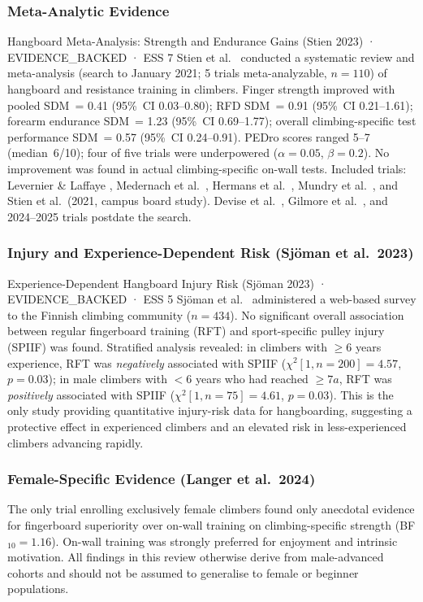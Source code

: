 \subsubsection{Meta-Analytic Evidence}

\begin{evidencebox}{Hangboard Meta-Analysis: Strength and Endurance Gains (Stien 2023) · EVIDENCE\_BACKED · ESS 7}
Stien et al.\ \cite{SO23} conducted a systematic review and meta-analysis (search to January 2021; 5 trials meta-analyzable, $n=110$) of hangboard and resistance training in climbers. Finger strength improved with pooled SDM~= 0.41 (95\%~CI 0.03--0.80); RFD SDM~= 0.91 (95\%~CI 0.21--1.61); forearm endurance SDM~= 1.23 (95\%~CI 0.69--1.77); overall climbing-specific test performance SDM~= 0.57 (95\%~CI 0.24--0.91). PEDro scores ranged 5--7 (median~6/10); four of five trials were underpowered ($\alpha = 0.05$, $\beta = 0.2$). No improvement was found in actual climbing-specific on-wall tests. Included trials: Levernier \& Laffaye \cite{LEV19}, Medernach et al.\ \cite{MO15}, Hermans et al.\ \cite{HO22}, Mundry et al.\ \cite{MSAE21}, and Stien et al.\ (2021, campus board study). Devise et al.\ \cite{DO22}, Gilmore et al.\ \cite{GKAO24}, and 2024--2025 trials postdate the search.
\end{evidencebox}

\subsubsection{Injury and Experience-Dependent Risk (Sjöman et al.\ 2023)}

\begin{evidencebox}{Experience-Dependent Hangboard Injury Risk (Sjöman 2023) · EVIDENCE\_BACKED · ESS 5}
Sjöman et al.\ \cite{O23} administered a web-based survey to the Finnish climbing community ($n=434$). No significant overall association between regular fingerboard training (RFT) and sport-specific pulley injury (SPIIF) was found. Stratified analysis revealed: in climbers with $\geq6$ years experience, RFT was \emph{negatively} associated with SPIIF ($\chi^2[1, n=200]=4.57$, $p=0.03$); in male climbers with $<6$ years who had reached $\geq7a$, RFT was \emph{positively} associated with SPIIF ($\chi^2[1, n=75]=4.61$, $p=0.03$). This is the only study providing quantitative injury-risk data for hangboarding, suggesting a protective effect in experienced climbers and an elevated risk in less-experienced climbers advancing rapidly.
\end{evidencebox}

\subsubsection{Female-Specific Evidence (Langer et al.\ 2024)}

The only trial enrolling exclusively female climbers \cite{LAS24} found only anecdotal evidence for fingerboard superiority over on-wall training on climbing-specific strength (BF$_{10}=1.16$). On-wall training was strongly preferred for enjoyment and intrinsic motivation. All findings in this review otherwise derive from male-advanced cohorts and should not be assumed to generalise to female or beginner populations.
